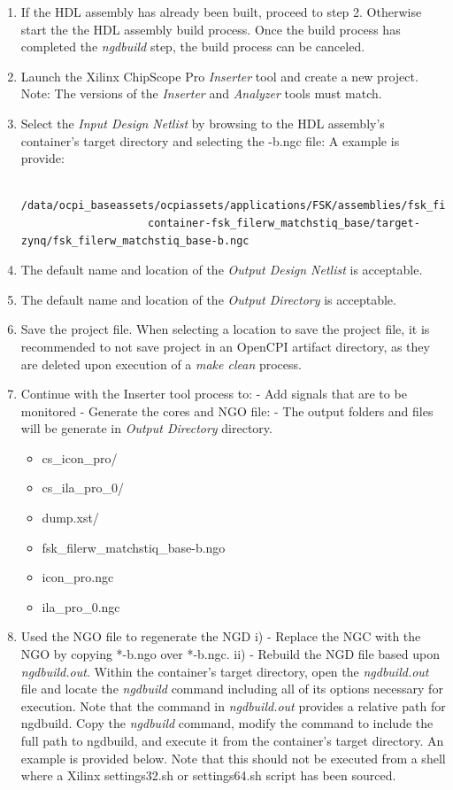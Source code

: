 \begin{flushleft}
		\begin{enumerate}
			\item If the HDL assembly has already been built, proceed to step 2. Otherwise start the
			the HDL assembly build process. Once the build process has completed the \textit{ngdbuild} step, the build process can be canceled.
			\item Launch the Xilinx ChipScope Pro \textit{Inserter} tool and create a new project.
				\subitem Note: The versions of the \textit{Inserter} and \textit{Analyzer} tools must match.
			\item Select the \textit{Input Design Netlist} by browsing to the HDL assembly's container's target directory and selecting the {}-b.ngc file: A example is provide:
				\small\begin{verbatim}
					/data/ocpi_baseassets/ocpiassets/applications/FSK/assemblies/fsk_filerw/
					container-fsk_filerw_matchstiq_base/target-zynq/fsk_filerw_matchstiq_base-b.ngc
			 	\end{verbatim}
			\item The default name and location of the \textit{Output Design Netlist} is acceptable.
			\item The default name and location of the \textit{Output Directory} is acceptable.
			\item Save the project file. When selecting a location to save the project file, it is recommended to not save project in an OpenCPI artifact directory, as they are deleted upon execution of a \textit{make clean} process.
			\item Continue with the Inserter tool process to:
				\subitem - Add signals that are to be monitored
				\subitem - Generate the cores and NGO file:
				\subsubitem - The output folders and files will be generate in \textit{Output Directory} directory.
					\small\begin{itemize}
						\item cs\_icon\_pro/
						\item cs\_ila\_pro\_0/
						\item dump.xst/
						\item fsk\_filerw\_matchstiq\_base-b.ngo
						\item icon\_pro.ngc
						\item ila\_pro\_0.ngc
					\end{itemize}
			\item Used the NGO file to regenerate the NGD
				\subitem i) - Replace the NGC with the NGO by copying *-b.ngo over *-b.ngc.
				\subitem ii) - Rebuild the NGD file based upon \textit{ngdbuild.out}.
					\subsubitem  Within the container's target directory, open the \textit{ngdbuild.out} file and locate the \textit{ngdbuild} command including all of its options necessary for execution. Note that the command in \textit{ngdbuild.out} provides a relative path for ngdbuild. Copy the \textit{ngdbuild} command, modify the command to include the full path to ngdbuild, and execute it from the container's target directory. An example is provided below. Note that this should not be executed from a shell where a Xilinx settings32.sh or settings64.sh script has been sourced.


\end{enumerate}
\end{flushleft}
